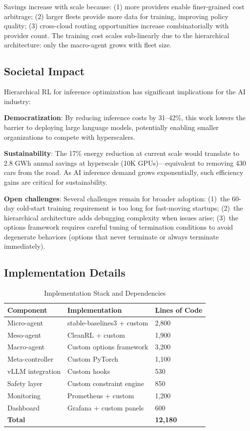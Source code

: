 \documentclass[conference,10pt]{IEEEtran}
\begin{document}
Savings increase with scale because: (1) more providers enable finer-grained cost arbitrage; (2) larger fleets provide more data for training, improving policy quality; (3) cross-cloud routing opportunities increase combinatorially with provider count. The training cost scales sub-linearly due to the hierarchical architecture: only the macro-agent grows with fleet size.

\subsection{Societal Impact}

Hierarchical RL for inference optimization has significant implications for the AI industry:

\textbf{Democratization}: By reducing inference costs by 31--42\%, this work lowers the barrier to deploying large language models, potentially enabling smaller organizations to compete with hyperscalers.

\textbf{Sustainability}: The 17\% energy reduction at current scale would translate to 2.8 GWh annual savings at hyperscale (10K GPUs)---equivalent to removing 430 cars from the road. As AI inference demand grows exponentially, such efficiency gains are critical for sustainability.

\textbf{Open challenges}: Several challenges remain for broader adoption: (1)~the 60-day cold-start training requirement is too long for fast-moving startups; (2)~the hierarchical architecture adds debugging complexity when issues arise; (3)~the options framework requires careful tuning of termination conditions to avoid degenerate behaviors (options that never terminate or always terminate immediately).

\subsection{Implementation Details}

\begin{table}[!htbp]
\caption{Implementation Stack and Dependencies}
\label{tab:impl}
\centering\scriptsize
\begin{tabular}{@{}lll@{}}
\toprule
\textbf{Component} & \textbf{Implementation} & \textbf{Lines of Code} \\
\midrule
Micro-agent & stable-baselines3 + custom & 2,800 \\
Meso-agent & CleanRL + custom & 1,900 \\
Macro-agent & Custom options framework & 3,200 \\
Meta-controller & Custom PyTorch & 1,100 \\
vLLM integration & Custom hooks & 530 \\
Safety layer & Custom constraint engine & 850 \\
Monitoring & Prometheus + custom & 1,200 \\
Dashboard & Grafana + custom panels & 600 \\
\midrule
\textbf{Total} & & \textbf{12,180} \\
\bottomrule
\end{tabular}
\end{table}
\end{document}
